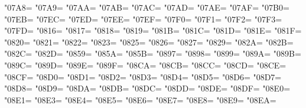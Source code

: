 \XeTeXcharclass"07A8=\KclassCM
\XeTeXcharclass"07A9=\KclassCM
\XeTeXcharclass"07AA=\KclassCM
\XeTeXcharclass"07AB=\KclassCM
\XeTeXcharclass"07AC=\KclassCM
\XeTeXcharclass"07AD=\KclassCM
\XeTeXcharclass"07AE=\KclassCM
\XeTeXcharclass"07AF=\KclassCM
\XeTeXcharclass"07B0=\KclassCM
\XeTeXcharclass"07EB=\KclassCM
\XeTeXcharclass"07EC=\KclassCM
\XeTeXcharclass"07ED=\KclassCM
\XeTeXcharclass"07EE=\KclassCM
\XeTeXcharclass"07EF=\KclassCM
\XeTeXcharclass"07F0=\KclassCM
\XeTeXcharclass"07F1=\KclassCM
\XeTeXcharclass"07F2=\KclassCM
\XeTeXcharclass"07F3=\KclassCM
\XeTeXcharclass"07FD=\KclassCM
\XeTeXcharclass"0816=\KclassCM
\XeTeXcharclass"0817=\KclassCM
\XeTeXcharclass"0818=\KclassCM
\XeTeXcharclass"0819=\KclassCM
\XeTeXcharclass"081B=\KclassCM
\XeTeXcharclass"081C=\KclassCM
\XeTeXcharclass"081D=\KclassCM
\XeTeXcharclass"081E=\KclassCM
\XeTeXcharclass"081F=\KclassCM
\XeTeXcharclass"0820=\KclassCM
\XeTeXcharclass"0821=\KclassCM
\XeTeXcharclass"0822=\KclassCM
\XeTeXcharclass"0823=\KclassCM
\XeTeXcharclass"0825=\KclassCM
\XeTeXcharclass"0826=\KclassCM
\XeTeXcharclass"0827=\KclassCM
\XeTeXcharclass"0829=\KclassCM
\XeTeXcharclass"082A=\KclassCM
\XeTeXcharclass"082B=\KclassCM
\XeTeXcharclass"082C=\KclassCM
\XeTeXcharclass"082D=\KclassCM
\XeTeXcharclass"0859=\KclassCM
\XeTeXcharclass"085A=\KclassCM
\XeTeXcharclass"085B=\KclassCM
\XeTeXcharclass"0897=\KclassCM
\XeTeXcharclass"0898=\KclassCM
\XeTeXcharclass"0899=\KclassCM
\XeTeXcharclass"089A=\KclassCM
\XeTeXcharclass"089B=\KclassCM
\XeTeXcharclass"089C=\KclassCM
\XeTeXcharclass"089D=\KclassCM
\XeTeXcharclass"089E=\KclassCM
\XeTeXcharclass"089F=\KclassCM
\XeTeXcharclass"08CA=\KclassCM
\XeTeXcharclass"08CB=\KclassCM
\XeTeXcharclass"08CC=\KclassCM
\XeTeXcharclass"08CD=\KclassCM
\XeTeXcharclass"08CE=\KclassCM
\XeTeXcharclass"08CF=\KclassCM
\XeTeXcharclass"08D0=\KclassCM
\XeTeXcharclass"08D1=\KclassCM
\XeTeXcharclass"08D2=\KclassCM
\XeTeXcharclass"08D3=\KclassCM
\XeTeXcharclass"08D4=\KclassCM
\XeTeXcharclass"08D5=\KclassCM
\XeTeXcharclass"08D6=\KclassCM
\XeTeXcharclass"08D7=\KclassCM
\XeTeXcharclass"08D8=\KclassCM
\XeTeXcharclass"08D9=\KclassCM
\XeTeXcharclass"08DA=\KclassCM
\XeTeXcharclass"08DB=\KclassCM
\XeTeXcharclass"08DC=\KclassCM
\XeTeXcharclass"08DD=\KclassCM
\XeTeXcharclass"08DE=\KclassCM
\XeTeXcharclass"08DF=\KclassCM
\XeTeXcharclass"08E0=\KclassCM
\XeTeXcharclass"08E1=\KclassCM
\XeTeXcharclass"08E3=\KclassCM
\XeTeXcharclass"08E4=\KclassCM
\XeTeXcharclass"08E5=\KclassCM
\XeTeXcharclass"08E6=\KclassCM
\XeTeXcharclass"08E7=\KclassCM
\XeTeXcharclass"08E8=\KclassCM
\XeTeXcharclass"08E9=\KclassCM
\XeTeXcharclass"08EA=\KclassCM
